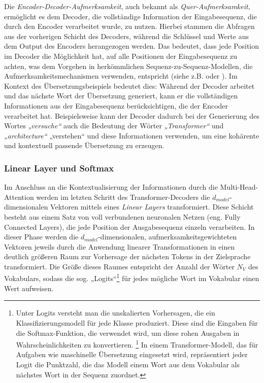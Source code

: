 Die \emph{Encoder-Decoder-Aufmerksamkeit}, auch bekannt als \emph{Quer-Aufmerksamkeit}, ermöglicht es dem Decoder, die vollständige Information der Eingabesequenz, die durch den Encoder verarbeitet wurde, zu nutzen. Hierbei stammen die Abfragen aus der vorherigen Schicht des Decoders, während die Schlüssel und Werte aus dem Output des Encoders herangezogen werden. Das bedeutet, dass jede Position im Decoder die Möglichkeit hat, auf alle Positionen der Eingabesequenz zu achten, was dem Vorgehen in herkömmlichen Sequenz-zu-Sequenz-Modellen, die Aufmerksamkeitsmechanismen verwenden, entspricht (siehe z.B. \cite{Conv_Seq2Seq_Learning} oder \cite{GoogleNeuralMachineTranslation}). Im Kontext des Übersetzungsbeispiels bedeutet dies: Während der Decoder arbeitet und das nächste Wort der Übersetzung generiert, kann er die vollständigen Informationen aus der Eingabesequenz berücksichtigen, die der Encoder verarbeitet hat. Beispielsweise kann der Decoder dadurch bei der Generierung des Wortes \emph{„versuche“} auch die Bedeutung der Wörter \emph{„Transformer“} und \emph{„architecture“} „verstehen“ und diese Informationen verwenden, um eine kohärente und kontextuell passende Übersetzung zu erzeugen.

\subsubsection*{Linear Layer und Softmax}

Im Anschluss an die Kontextualisierung der Informationen durch die Multi-Head-Attention werden im letzten Schritt des Transformer-Decoders die $d_{model}$-dimensionalen Vektoren mittels eines \emph{Linear Layers} transformiert. Diese Schicht besteht aus einem Satz von voll verbundenen neuronalen Netzen (eng. Fully Connected Layers), die jede Position der Ausgabesequenz einzeln verarbeiten. In dieser Phase werden die $d_{model}$-dimensionalen, aufmerksamkeitsgewichteten Vektoren jeweils durch die Anwendung linearer Transformationen in einen deutlich größeren Raum zur Vorhersage der nächsten Tokens in der Zielsprache transformiert. Die Größe dieses Raumes entspricht der Anzahl der Wörter $N_V$ des Vokabulars, sodass die sog. „Logits“\footnote{Unter Logits versteht man die unskalierten Vorhersagen, die ein Klassifizierungsmodell für jede Klasse produziert. Diese sind die Eingaben für die Softmax-Funktion, die verwendet wird, um diese rohen Ausgaben in Wahrscheinlichkeiten zu konvertieren. \footcite{MitigatingNNOverconfidenceWithLogitNormalization} In einem Transformer-Modell, das für Aufgaben wie maschinelle Übersetzung eingesetzt wird, repräsentiert jeder Logit die Punktzahl, die das Modell einem Wort aus dem Vokabular als nächstes Wort in der Sequenz zuordnet.} für jedes mögliche Wort im Vokabular einen Wert aufweisen. 

